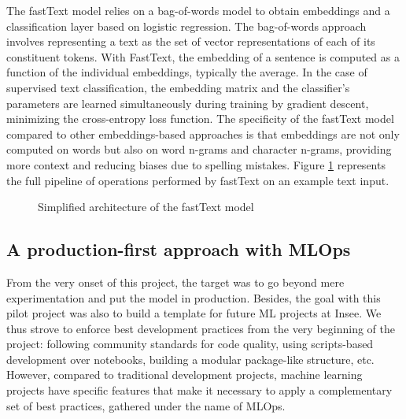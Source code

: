 The fastText model relies on a bag-of-words model to obtain embeddings and a classification layer based on logistic regression. The bag-of-words approach involves representing a text as the set of vector representations of each of its constituent tokens. With FastText, the embedding of a sentence is computed as a function of the individual embeddings, typically the average. In the case of supervised text classification, the embedding matrix and the classifier's parameters are learned simultaneously during training by gradient descent, minimizing the cross-entropy loss function. The specificity of the fastText model compared to other embeddings-based approaches is that embeddings are not only computed on words but also on word n-grams and character n-grams, providing more context and reducing biases due to spelling mistakes. Figure \ref{fig:fasttext} represents the full pipeline of operations performed by fastText on an example text input.

\begin{figure}[htbp]
    \centering
    \caption{Simplified architecture of the fastText model}
    \label{fig:fasttext}
\end{figure}






\subsection{A production-first approach with MLOps}

From the very onset of this project, the target was to go beyond mere experimentation and put the model in production. Besides, the goal with this pilot project was also to build a template for future ML projects at Insee. We thus strove to enforce best development practices from the very beginning of the project: following community standards for code quality, using scripts-based development over notebooks, building a modular package-like structure, etc. However, compared to traditional development projects, machine learning projects have specific features that make it necessary to apply a complementary set of best practices, gathered under the name of MLOps.

